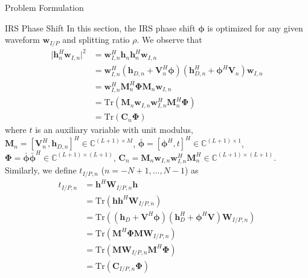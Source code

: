 \documentclass{IEEEtran}
\begin{document}
\begin{section}{Problem Formulation}
	\begin{subsection}{IRS Phase Shift}
		In this section, the IRS phase shift $\boldsymbol{\phi}$ is optimized for any given waveform $\boldsymbol{w}_{I/P}$ and splitting ratio $\rho$. We observe that
		\begin{equation}
			\begin{split}
				\lvert \boldsymbol{h}_{n}^H\boldsymbol{w}_{I,n} \rvert^2
				& = \boldsymbol{w}_{I,n}^H\boldsymbol{h}_n\boldsymbol{h}_n^H\boldsymbol{w}_{I,n}\\
				& = \boldsymbol{w}_{I,n}^H(\boldsymbol{h}_{D,n}+\boldsymbol{V}_n^H\boldsymbol{\phi})(\boldsymbol{h}_{D,n}^H+\boldsymbol{\phi}^H\boldsymbol{V}_n)\boldsymbol{w}_{I,n}\\
				& = \boldsymbol{w}_{I,n}^H\boldsymbol{M}_n^H\boldsymbol{\Phi}\boldsymbol{M}_n\boldsymbol{w}_{I,n}\\
				& = \mathrm{Tr}(\boldsymbol{M}_n\boldsymbol{w}_{I,n}\boldsymbol{w}_{I,n}^H\boldsymbol{M}_n^H\boldsymbol{\Phi})\\
				& = \mathrm{Tr}(\boldsymbol{C}_n\boldsymbol{\Phi})
			\end{split}
		\end{equation}
		where $t$ is an auxiliary variable with unit modulus, $\boldsymbol{M}_n=[\boldsymbol{V}_n^H, \boldsymbol{h}_{D,n}]^H \in \mathbb{C}^{(L+1) \times M}$, $\bar{\boldsymbol{\phi}}=[\boldsymbol{\phi}^H, t]^H \in \mathbb{C}^{(L+1) \times 1}$, $\boldsymbol{\Phi}=\bar{\boldsymbol{\phi}}\bar{\boldsymbol{\phi}}^H \in \mathbb{C}^{(L+1) \times (L+1)}$, $\boldsymbol{C}_n = \boldsymbol{M}_n\boldsymbol{w}_{I,n}\boldsymbol{w}_{I,n}^H\boldsymbol{M}_n^H \in \mathbb{C}^{(L+1)\times(L+1)}$. Similarly, we define $t_{I/P,n}$ ($n=-N+1,\dots,N-1$) as
		\begin{equation}
			\begin{split}
				t_{I/P,n}
				& = \boldsymbol{h}^H\boldsymbol{W}_{I/P,n}\boldsymbol{h}\\
				& = \mathrm{Tr}(\boldsymbol{h}\boldsymbol{h}^H\boldsymbol{W}_{I/P,n})\\
				& = \mathrm{Tr}\left((\boldsymbol{h}_{D}+\boldsymbol{V}^H\boldsymbol{\phi})(\boldsymbol{h}_{D}^H+\boldsymbol{\phi}^H\boldsymbol{V})\boldsymbol{W}_{I/P,n}\right)\\
				& = \mathrm{Tr}(\boldsymbol{M}^H\boldsymbol{\Phi}\boldsymbol{M}\boldsymbol{W}_{I/P,n})\\
				& = \mathrm{Tr}(\boldsymbol{M}\boldsymbol{W}_{I/P,n}\boldsymbol{M}^H\boldsymbol{\Phi})\\
				& = \mathrm{Tr}(\boldsymbol{C}_{I/P,n}\boldsymbol{\Phi})

\end{split}
\end{equation}
\end{subsection}
\end{section}
\end{document}
